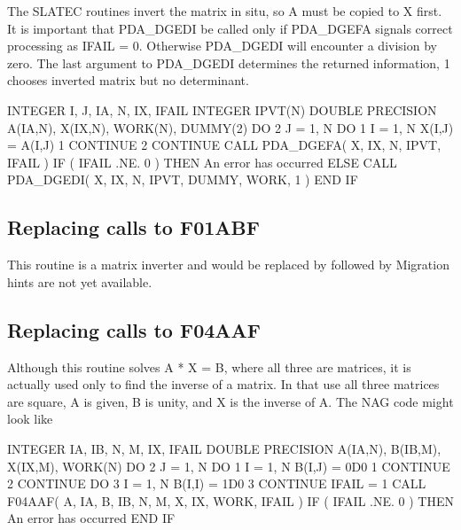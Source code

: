 \documentclass[11pt,twoside,nolof]{starlink}
\begin{document}
   The SLATEC routines invert the matrix in situ, so A must be copied to
   X first. It is important that PDA\_DGEDI be called only if PDA\_DGEFA
   signals correct processing as IFAIL = 0. Otherwise PDA\_DGEDI will
   encounter a division by zero. The last argument to PDA\_DGEDI
   determines the returned information, 1 chooses inverted matrix but no
   determinant.

\begin{terminalv}
      INTEGER I, J, IA, N, IX, IFAIL
      INTEGER IPVT(N)
      DOUBLE PRECISION A(IA,N), X(IX,N), WORK(N), DUMMY(2)
      DO 2 J = 1, N
         DO 1 I = 1, N
            X(I,J) = A(I,J)
    1    CONTINUE
    2 CONTINUE
      CALL PDA_DGEFA( X, IX, N, IPVT, IFAIL )
      IF ( IFAIL .NE. 0 ) THEN
         An error has occurred
      ELSE
         CALL PDA_DGEDI( X, IX, N, IPVT, DUMMY, WORK, 1 )
      END IF
\end{terminalv}


\subsection{Replacing calls to F01ABF}

   This routine is a matrix inverter and would be replaced
   by
   followed by
   Migration hints are not yet available.


\subsection{Replacing calls to F04AAF}

   Although this routine solves A * X = B, where all three are matrices,
   it is actually used only to find the inverse of a matrix. In that use
   all three matrices are square, A is given, B is unity, and X is the
   inverse of A. The NAG code might look like

\begin{terminalv}
      INTEGER IA, IB, N, M, IX, IFAIL
      DOUBLE PRECISION A(IA,N), B(IB,M), X(IX,M), WORK(N)
      DO 2 J = 1, N
         DO 1 I = 1, N
            B(I,J) = 0D0
    1    CONTINUE
    2 CONTINUE
      DO 3 I = 1, N
         B(I,I) = 1D0
    3 CONTINUE
      IFAIL = 1
      CALL F04AAF( A, IA, B, IB, N, M, X, IX, WORK, IFAIL )
      IF ( IFAIL .NE. 0 ) THEN
         An error has occurred
      END IF
\end{terminalv}
\end{document}
